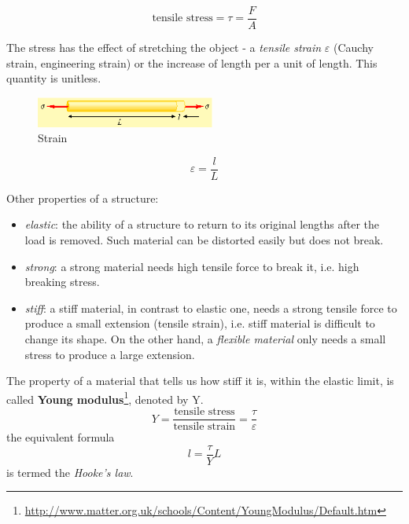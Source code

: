 \begin{equation}
  \label{eq:59}
  \text{tensile stress} = \tau = \frac{F}{A}
\end{equation}

The stress has the effect of stretching the object - a
{\it tensile strain} $\varepsilon$ (Cauchy strain, engineering strain) or the
increase of length per a unit of length. This quantity is unitless.
  \begin{figure}[htb]
    \centerline{\includegraphics[height=1cm]{./images/strain.eps}}
    \caption{Strain}\label{fig:strain}
  \end{figure}

\begin{equation}
  \label{eq:58}
  \varepsilon = \frac{l}{L}
\end{equation}


Other properties of a structure:
\begin{itemize}
\item {\it elastic}: the ability of a structure to return to its
  original lengths after the load is removed. Such material can be
  distorted easily but does not break.

\item {\it strong}: a strong material needs high tensile force to
  break it, i.e. high breaking stress.

\item {\it stiff}:  a stiff material, in contrast to elastic one,
  needs a strong tensile force to produce a small extension (tensile
  strain), i.e. stiff material is difficult to change its shape. On
  the other hand, a {\it flexible material} only needs a small stress
  to produce a large extension.
\end{itemize}

The property of a material that tells us how stiff it is, within the
elastic limit, is called {\bf Young modulus}\footnote{\url{http://www.matter.org.uk/schools/Content/YoungModulus/Default.htm}}, denoted by Y.
\begin{equation}
  \label{eq:60}
  Y = \frac{\text{tensile stress}}{\text{tensile strain}} = \frac{\tau}{\varepsilon}
\end{equation}
the equivalent formula
\begin{equation}
  \label{eq:61}
  l = \frac{\tau}{Y}L
\end{equation}
is termed the {\it Hooke's law}.


